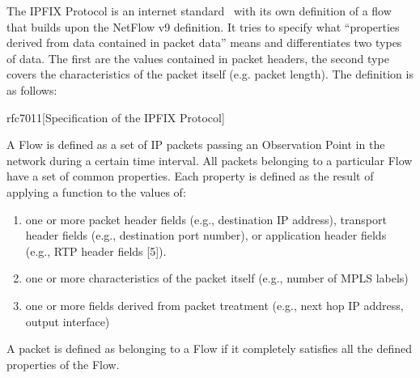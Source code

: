 The IPFIX Protocol is an internet standard~\cite{rfc7011} with its own definition of a flow that builds upon the NetFlow v9 definition. It tries to specify what “properties derived from data contained in packet data” means and differentiates two types of data. The first are the values contained in packet headers, the second type covers the characteristics of the packet itself (e.g. packet length). The definition is as follows:

\begin{displaycquote}{rfc7011}[Specification of the IPFIX Protocol]

    A Flow is defined as a set of IP packets passing an Observation
    Point in the network during a certain time interval.  All packets
    belonging to a particular Flow have a set of common properties.
    Each property is defined as the result of applying a function to
    the values of:

    \begin{enumerate}
    \item one or more packet header fields (e.g., destination IP
        address), transport header fields (e.g., destination port
        number), or application header fields (e.g., RTP header fields
        [5]).

    \item one or more characteristics of the packet itself (e.g., number
        of MPLS labels)

    \item one or more fields derived from packet treatment (e.g., next
        hop IP address, output interface)
	\end{enumerate}
        
    A packet is defined as belonging to a Flow if it completely
    satisfies all the defined properties of the Flow.

\end{displaycquote}

